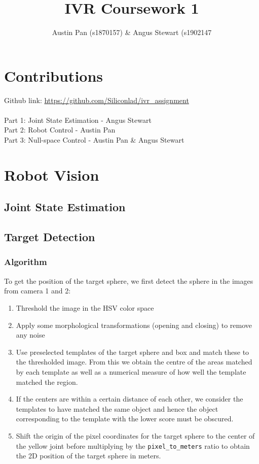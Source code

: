 \documentclass[11pt]{article}
\begin{document}
\title{IVR Coursework 1}
\author{Austin Pan (s1870157) \& Angus Stewart (s1902147}
\maketitle

\section{Contributions}
Github link: \href{https://github.com/Siliconlad/ivr\_assignment}{https://github.com/Siliconlad/ivr\_assignment} \\ \\
Part 1: Joint State Estimation - Angus Stewart \\
Part 2: Robot Control - Austin Pan \\
Part 3: Null-space Control - Austin Pan \& Angus Stewart

\section{Robot Vision}

\subsection{Joint State Estimation}

\subsection{Target Detection}

\subsubsection{Algorithm}

To get the position of the target sphere, we first detect the sphere in the images from camera 1 and 2:
\begin{enumerate}
	\item Threshold the image in the HSV color space
	\item Apply some morphological transformations (opening and closing) to remove any noise
	\item Use preselected templates of the target sphere and box and match these to the thresholded image. From this we obtain the centre of the areas matched by each template as well as a numerical measure of how well the template matched the region.
	\item If the centers are within a certain distance of each other, we consider the templates to have matched the same object and hence the object corresponding to the template with the lower score must be obscured.
	\item Shift the origin of the pixel coordinates for the target sphere to the center of the yellow joint before multiplying by the \texttt{pixel\_to\_meters} ratio to obtain the 2D position of the target sphere in meters.
\end{enumerate}
\end{document}
